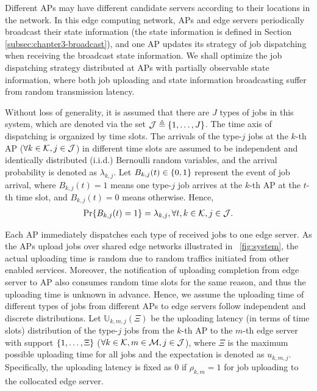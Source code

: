 Different APs may have different candidate servers according to their locations in the network.
In this edge computing network, APs and edge servers periodically broadcast their state information (the state information is defined in Section \ref{subsec:chapter3-broadcast}), and one AP updates its strategy of job dispatching when receiving the broadcast state information.
We shall optimize the job dispatching strategy distributed at APs with partially observable state information, where both job uploading and state information broadcasting suffer from random transmission latency.

Without loss of generality, it is assumed that there are $J$ types of jobs in this system, which are denoted via the set $\mathcal{J} \triangleq \{1,\dots,J\}$.
The time axis of dispatching is organized by time slots.
The arrivals of the type-$j$ jobs at the $k$-th AP ($\forall k\in\mathcal{K},j\in\mathcal{J}$) in different time slots are assumed to be independent and identically distributed (i.i.d.) Bernoulli random variables, and the arrival probability is denoted as $\lambda_{k,j}$.
Let $B_{k,j}(t) \in \{0,1\}$ represent the event of job arrival, where $B_{k,j}(t)=1$ means one type-$j$ job arrives at the $k$-th AP at the $t$-th time slot, and $B_{k,j}(t)=0$ means otherwise.
Hence,
\begin{align}
    \Pr\{ B_{k,j}(t) = 1 \} = \lambda_{k,j}, \forall t,k\in\mathcal{K},j\in\mathcal{J}.
\end{align}

Each AP immediately dispatches each type of received jobs to one edge server.
As the APs upload jobs over shared edge networks illustrated in \figurename~\ref{fig:system}, the actual uploading time is random due to random traffics initiated from other enabled services.
Moreover, the notification of uploading completion from edge server to AP also consumes random time slots for the same reason, and thus the uploading time is unknown in advance.
Hence, we assume the uploading time of different types of jobs from different APs to edge servers follow independent and discrete distributions.
Let $\mathbb{U}_{k,m,j}(\Xi)$ be the uploading latency (in terms of time slots) distribution of the type-$j$ jobs from the $k$-th AP to the $m$-th edge server with support $\{1, \dots, \Xi\}$ ($\forall k\in\mathcal{K}, m\in\mathcal{M}, j\in\mathcal{J}$), where $\Xi$ is the maximum possible uploading time for all jobs and the expectation is denoted as $u_{k,m,j}$.
Specifically, the uploading latency is fixed as $0$ if $\rho_{k,m}=1$ for job uploading to the collocated edge server.

